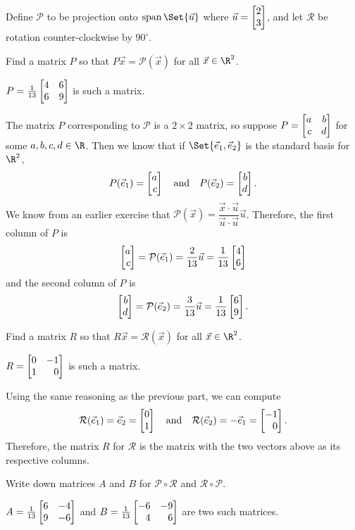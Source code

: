 	\label{projectionAndRotation}
	Define $\mathcal P$ to be projection onto $\Span\Set{\vec u}$ where $\vec u=\mat{2\\3}$,
	and let $\mathcal R$ be rotation counter-clockwise by $90^\circ$.
	\begin{parts}
		\item Find a matrix $P$ so that $P\vec x=\mathcal P(\vec x)$ for all $\vec x\in\R^2$.
			\begin{solution}
				$P = \frac{1}{13}\mat{4&6\\6&9}$ is such a matrix.

				The matrix $P$ corresponding to $\mathcal P$ is a $2\times 2$ matrix,
				so suppose $P=\mat{a&b\\c&d}$ for some $a,b,c,d\in\R$. Then we
				know that if $\Set{\xhat,\yhat}$ is the standard basis for $\R^2$,
				\[
					P(\xhat)=\mat{a\\c} \quad \text{and} \quad P(\yhat)=\mat{b\\d}.
				\]
				We know from an earlier exercise that
				$\mathcal P(\vec x)=\dfrac{\vec x\cdot\vec u}{\vec u\cdot\vec u}\vec u$.
				Therefore, the first column of $P$ is
				\[
					\mat{a\\c}=\mathcal P(\xhat)=\frac{2}{13}\vec u=\frac{1}{13}\mat{4\\6}
				\]
				and the second column of $P$ is
				\[
					\mat{b\\d}=\mathcal P(\yhat)=\frac{3}{13}\vec u=\frac{1}{13}\mat{6\\9}.
				\]
			\end{solution}
		\item Find a matrix $R$ so that $R\vec x=\mathcal R(\vec x)$ for all $\vec x\in\R^2$.
			\begin{solution}
				$R=\mat{0&-1\\1&0}$ is such a matrix.

				Using the same reasoning as the previous part, we can compute
				\[
					\mathcal R(\xhat)=\yhat=\mat{0\\1}
					\quad \text{and} \quad
					\mathcal R(\yhat)=-\xhat=\mat{-1\\0}.
				\]
				Therefore, the matrix $R$ for $\mathcal R$ is the matrix with the
				two vectors above as its respective columns.
			\end{solution}
		\item Write down matrices $A$ and $B$ for $\mathcal P\circ\mathcal R$
			and $\mathcal R\circ \mathcal P$.
			\begin{solution}
				$A=\frac{1}{13}\mat{6&-4\\9&-6}$ and $B=\frac{1}{13}\mat{-6&-9\\4&6}$
				are two such matrices.


\end{solution}
\end{parts}
